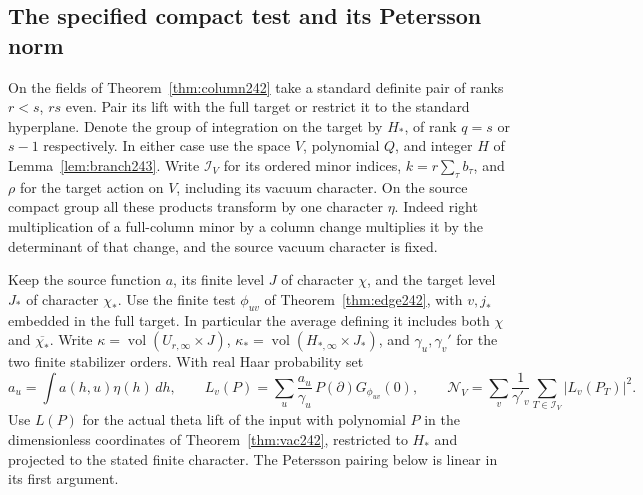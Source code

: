 \documentclass[a4paper,11pt]{article}
\theoremstyle{definition}
\theoremstyle{remark}
\numberwithin{equation}{section}
\begin{document}
\subsection{The specified compact test and its Petersson norm}\label{nav:VII-36}
On the fields of Theorem~\ref{thm:column242} take a standard
definite pair of ranks \(r<s\), \(rs\) even. Pair its lift with
the full target or restrict it to the standard hyperplane. Denote
the group of integration on the target by \(H_*\), of rank
\(q=s\) or \(s-1\) respectively. In either case use the space
\(V\), polynomial \(Q\), and integer \(H\) of
Lemma~\ref{lem:branch243}. Write \(\mathcal I_V\) for its ordered
minor indices, \(k=r\sum_\tau b_\tau\), and \(\rho\) for the
target action on \(V\), including its vacuum character. On the
source compact group all these products transform by one character
\(\eta\). Indeed right multiplication of a full-column minor by a
column change multiplies it by the determinant of that change,
and the source vacuum character is fixed.

Keep the source function \(a\), its finite level \(J\) of
character \(\chi\), and the target level \(J_*\) of character
\(\chi_*\). Use the finite test \(\phi_{uv}\) of
Theorem~\ref{thm:edge242}, with \(v,j_*\) embedded in the full
target. In particular the average defining it includes both
\(\chi\) and \(\overline{\chi_*}\). Write
\(\kappa=\operatorname{vol}(U_{r,\infty}\times J)\),
\(\kappa_*=\operatorname{vol}(H_{*,\infty}\times J_*)\), and
\(\gamma_u,\gamma_v'\) for the two finite stabilizer orders.
With real Haar probability set
\[
 a_u=\int a(h,u)\eta(h)\,dh,\qquad
 L_v(P)=\sum_u\frac{a_u}{\gamma_u}\,
                          P(\partial)G_{\phi_{uv}}(0),\qquad
 \mathcal N_V=\sum_v\frac{1}{\gamma'_v}
                         \sum_{T\in\mathcal I_V}|L_v(P_T)|^2 .
\]
Use \(L(P)\) for the actual theta lift of the input with polynomial
\(P\) in the dimensionless coordinates of Theorem~\ref{thm:vac242},
restricted to \(H_*\) and projected to the stated finite character.
The Petersson pairing below is linear in its first argument.
\end{document}
